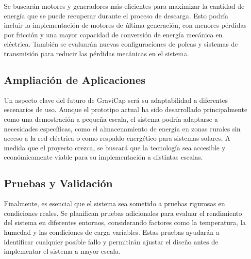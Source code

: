             Se buscarán motores y generadores más eficientes para maximizar la cantidad de energía que se puede recuperar durante el proceso de descarga. Esto podría incluir la implementación de motores de última generación, con menores pérdidas por fricción y una mayor capacidad de conversión de energía mecánica en eléctrica. También se evaluarán nuevas configuraciones de poleas y sistemas de transmisión para reducir las pérdidas mecánicas en el sistema.\par
        
        \subsection{Ampliación de Aplicaciones}
        
            Un aspecto clave del futuro de \textcolor{dark_violet}{GraviCap} será su adaptabilidad a diferentes escenarios de uso. Aunque el prototipo actual ha sido desarrollado principalmente como una demostración a pequeña escala, el sistema podría adaptarse a necesidades específicas, como el almacenamiento de energía en zonas rurales sin acceso a la red eléctrica o como respaldo energético para sistemas solares. A medida que el proyecto crezca, se buscará que la tecnología sea accesible y económicamente viable para su implementación a distintas escalas.\par
        
        \subsection{Pruebas y Validación}
            Finalmente, es esencial que el sistema sea sometido a pruebas rigurosas en condiciones reales. Se planifican pruebas adicionales para evaluar el rendimiento del sistema en diferentes entornos, considerando factores como la temperatura, la humedad y las condiciones de carga variables. Estas pruebas ayudarán a identificar cualquier posible fallo y permitirán ajustar el diseño antes de implementar el sistema a mayor escala.\par